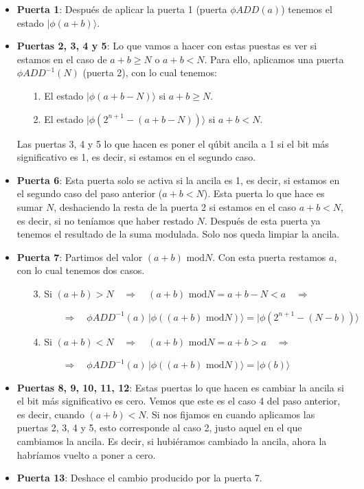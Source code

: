 \documentclass[a4paper,11pt]{book} %
\numberwithin{equation}{chapter}
\begin{document}
\begin{itemize}

	\item \textbf{Puerta 1}: Después de aplicar la puerta 1 (puerta $\phi ADD(a)$) tenemos el estado $| \phi(a+b) \rangle$.

	\item \textbf{Puertas 2, 3, 4 y 5}: Lo que vamos a hacer con estas puestas es ver si estamos en el caso de $a+b \geq N$ o $a+b <N$. Para ello, aplicamos una puerta $\phi ADD^{-1}(N)$ (puerta 2), con lo cual tenemos:
	\begin{itemize}
		\item[1.] El estado $| \phi(a+b - N) \rangle$ si $a+b \geq N$.
		\item[2.] El estado $| \phi(2^{n+1} -(a+b - N)) \rangle$ si $a+b < N$.
	\end{itemize}		
	
    Las puertas 3, 4 y 5 lo que hacen es poner el qúbit ancila a 1 si el bit más significativo es 1, es decir, si estamos en el segundo caso. 

	\item \textbf{Puerta 6}: Esta puerta solo se activa si la ancila es 1, es decir, si estamos en el segundo caso del paso anterior ($a+b < N$). Esta puerta lo que hace es sumar $N$, deshaciendo la resta de la puerta 2 si estamos en el caso $a+b < N$, es decir, si no teníamos que haber restado $N$. Después de esta puerta ya tenemos el resultado de la suma modulada. Solo nos queda limpiar la ancila.

	\item \textbf{Puerta 7}: Partimos del valor $(a+b) \text{ mod} N$. Con esta puerta restamos $a$, con lo cual tenemos dos casos.
	\begin{itemize}
		\item[3.] Si  $(a+b) > N \quad \Rightarrow \quad (a+b) \text{ mod} N = a+b-N < a \quad \Rightarrow $
		
		$\qquad \quad \Rightarrow \quad \phi ADD^{-1}(a) \, | \phi ((a+b) \text{ mod} N) \rangle = | \phi ( 2^{n+1} - (N - b) ) \rangle$

		\item[4.] Si $(a+b) < N \quad \Rightarrow \quad (a+b) \text{ mod} N = a+b > a \quad \Rightarrow $
		
		$\qquad \quad \Rightarrow \quad \phi ADD^{-1}(a) \, | \phi ((a+b) \text{ mod} N) \rangle = | \phi ( b ) \rangle$
				
	\end{itemize}

	\item \textbf{Puertas 8, 9, 10, 11, 12}: Estas puertas lo que hacen es cambiar la ancila si el bit más significativo es cero. Vemos que este es el caso 4 del paso anterior, es decir, cuando $(a+b) < N$. Si nos fijamos en cuando aplicamos las puertas 2, 3, 4 y 5, esto corresponde al caso 2, justo aquel en el que cambiamos la ancila. Es decir, si hubiéramos cambiado la ancila, ahora la habríamos vuelto a poner a cero.

	\item \textbf{Puerta 13}: Deshace el cambio producido por la puerta 7.

\end{itemize}
\end{document}
